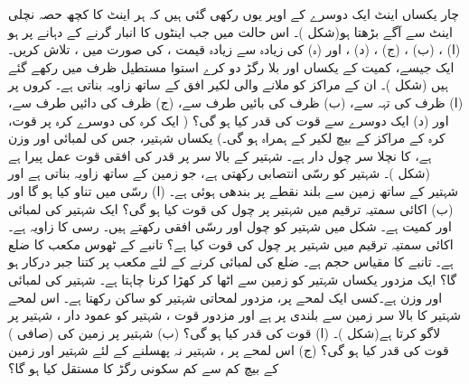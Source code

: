 چار  یکساں اینٹ ایک دوسرے کے اوپر  یوں رکھی گئی ہیں  کہ  ہر اینٹ کا کچھ حصہ نچلی اینٹ سے  آگے بڑھتا ہو(شکل )۔ اس   حالت  میں جب اینٹوں کا انبار گرنے کے دہانے پر ہو  (ا) ،  (ب) ،  (ج) ،  (د) ، اور  (ہ)  کی  زیادہ سے زیادہ قیمت ،  کی صورت میں ، تلاش کریں۔
ایک جیسے،  کمیت کے  یکساں  اور  بلا رگڑ  دو  کرے استوا مستطیل ظرف  میں رکھے گئے ہیں (شکل )۔ ان کے مراکز کو ملانے والی لکیر افق کے ساتھ  زاویہ بناتی ہے۔  کروں پر (ا) ظرف کی تہہ سے، (ب) ظرف کی بائیں طرف سے،  (ج) ظرف کی دائیں طرف سے، اور (د) ایک دوسرے سے قوت کی قدر کیا ہو گی؟ ( ایک کرہ کی  دوسرے کرہ پر قوت،  کرہ کے مراکز کے بیچ لکیر کے ہمراہ ہو گی۔)
یکساں شہتیر، جس کی لمبائی  اور وزن  ہے، کا نچلا سر چول دار ہے۔ شہتیر کے بالا سر پر  قدر  کی افقی قوت  عمل پیرا ہے (شکل )۔ شہتیر کو  رسّی انتصابی رکھتی ہے، جو زمین کے
 ساتھ  زاویہ بناتی ہے اور شہتیر کے ساتھ زمین سے  بلند نقطے پر بندھی ہوئی ہے۔ (ا)  رسّی میں تناو کیا ہو گا اور (ب)  اکائی سمتیہ ترقیم میں شہتیر پر چول کی قوت کیا ہو گی؟
ایک شہتیر کی لمبائی  اور کمیت  ہے۔ شکل  میں  شہتیر کو چول اور رسّی  افقی  رکھتے ہیں۔ رسی کا زاویہ  ہے۔ اکائی سمتیہ ترقیم میں  شہتیر پر چول کی قوت کیا ہے؟
تانبے  کے ٹھوس  مکعب  کا ضلع  ہے۔ تانبے کا مقیاس حجم  ہے۔ ضلع کی لمبائی  کرنے کے لئے مکعب  پر کتنا  جبر درکار ہو گا؟
ایک مزدور یکساں شہتیر کو زمین سے اٹھا کر کھڑا کرنا چاہتا ہے۔ شہتیر کی لمبائی  اور  وزن  ہے۔کسی ایک لمحے پر، مزدور لمحاتی شہتیر کو ساکن رکھتا ہے۔ اس لمحے   شہتیر کا بالا سر زمین سے  بلندی پر ہے  اور مزدور قوت  ، شہتیر  کو  عمود دار   ، شہتیر پر لاگو کرتا ہے(شکل )۔ (ا) قوت کی قدر   کیا ہو گی؟ (ب)  شہتیر پر زمین کی   (صافی  ) قوت کی قدر کیا ہو گی؟ (ج)  اس لمحے پر ، شہتیر نہ پھسلنے  کے لئے شہتیر اور زمین کے بیچ کم سے کم سکونی رگڑ کا مستقل کیا ہو گا؟
